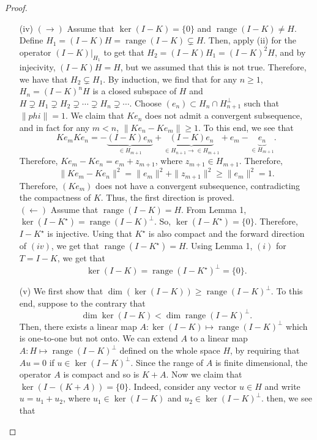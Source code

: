 \documentclass[12pt]{article}
\DeclareMathOperator{\range}{range}
\newcommand{\sbs}{\subset}
\newcommand{\Ks}{K^{\star}}
\begin{document}
\begin{proof}
\begin{enumerate}
\item[(iv)] $(\rightarrow)$ Assume that $\ker(I - K) = \{ 0 \}$ and $\range(I - K) \neq H$. Define $H_1 = (I - K)H = \range(I - K) \subsetneq H$. Then, apply (ii) for the operator $(I - K) \vert_{H_1}$ to get that $H_2 = (I - K) H_1 = (I - K)^2 H$, and by injecivity, $(I - K) H = H$, but we assumed that this is not true. Therefore, we have that $H_2 \subsetneq H_1$. By induction, we find that for any $n \geq 1$, $H_n = (I - K)^n H$ is a closed subspace of $H$ and $H \supsetneq H_1 \supsetneq H_2 \supsetneq \cdots \supsetneq H_n \supsetneq \cdots$. Choose $(e_n) \sbs H_n \cap H_{n + 1}^{\perp}$ such that $\| phi \| = 1$. We claim that $Ke_n$ does not admit a convergent subsequence, and in fact for any $m < n$, $\| K e_n - K e_m \| \geq 1$. To this end, we see that 
\[ Ke_m K e_n = - \underbrace{(I - K) e_m}_{\in H_{m+1}}+ \underbrace{(I - K) e_n}_{\in H_{n+1} \rightarrow \in H_{m+1}} + e_m - \underbrace{e_n}_{\in H_{m+1}}.\]
Therefore, $K e_m - Ke_n = e_m + z_{m + 1}$, where $z_{m + 1} \in H_{m + 1}$. Therefore, 
\[ \| K e_m - K e_n \|^2 = \| e_m \|^2 + \| z_{m + 1}\|^2 \geq \| e_m \|^2 = 1.\]
Therefore, $(Ke_m)$ does not have a convergent subsequence, contradicting the compactness of $K$. Thus, the first direction is proved. \\
\indent $(\leftarrow)$ Assume that $\range(I - K) = H$. From Lemma 1, $\ker(I - \Ks) = \range(I - K)^{\perp}$. So, $\ker(I - \Ks) = \{ 0 \}$. Therefore, $I - \Ks$ is injective. Using that $\Ks$ is also compact and the forward direction of $(iv)$, we get that $\range(I - \Ks) = H$. Using Lemma 1, $(i)$ for $T = I - K$, we get that 
\[ \ker(I - K) = \range(I - \Ks)^{\perp} = \{ 0\}.\]
\item[(v)] We first show that $\dim(\ker(I - K)) \geq \range(I - K)^{\perp}$. To this end, suppose to the contrary that 
\begin{equation}
\dim \ker(I - K) < \dim \range(I - K)^{\perp}.
\end{equation}
Then, there exists a linear map $A: \ker(I - K) \mapsto \range(I - K)^{\perp}$ which is one-to-one but not onto. We can extend $A$ to a linear map $A : H \mapsto \range(I - K)^{\perp}$ defined on the whole space $H$, by requiring that $Au = 0$ if $u \in \ker(I - K)^{\perp}$. Since the range of $A$ is finite dimensional, the operator $A$ is compact and so is $K + A$. Now we claim that $\ker(I - (K + A)) = \{ 0 \}$. Indeed, consider any vector $u \in H$ and write $u = u_1 + u_2$, where $u_1 \in \ker(I - K)$ and $u_2 \in \ker(I - K)^{\perp}$. then, we see that
\begin{equation}

\end{equation}
\end{enumerate}
\end{proof}
\end{document}
